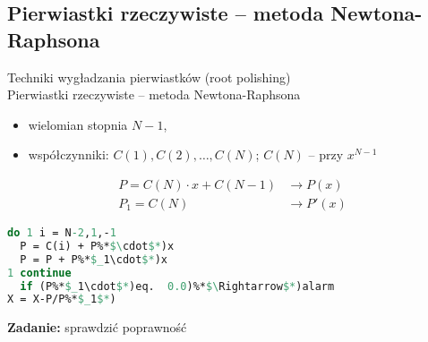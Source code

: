 \subsection{Pierwiastki rzeczywiste -- metoda Newtona-Raphsona}

\begin{frame}{Techniki wygładzania pierwiastków (root polishing) \\Pierwiastki rzeczywiste -- metoda Newtona-Raphsona}
  \begin{itemize}
    \item wielomian stopnia $N-1$,
    \item współczynniki: $C(1), C(2), \dots, C(N)$; $C(N)$ -- przy $x^{N-1}$
  \end{itemize}

  $$\begin{array}{ll}
  P = C(N) \cdot x + C(N-1) & \rightarrow P(x) \\
  P_1 = C(N) & \rightarrow P'(x)
  \end{array}$$
\end{frame}

\begin{frame}[fragile]
  \begin{lstlisting}[language=Pascal]
do 1 i = N-2,1,-1
  P = C(i) + P%*$\cdot$*)x
  P = P + P%*$_1\cdot$*)x
1 continue
  if (P%*$_1\cdot$*)eq.  0.0)%*$\Rightarrow$*)alarm
X = X-P/P%*$_1$*)
\end{lstlisting}

  \textbf{Zadanie:} sprawdzić poprawność
\end{frame}
